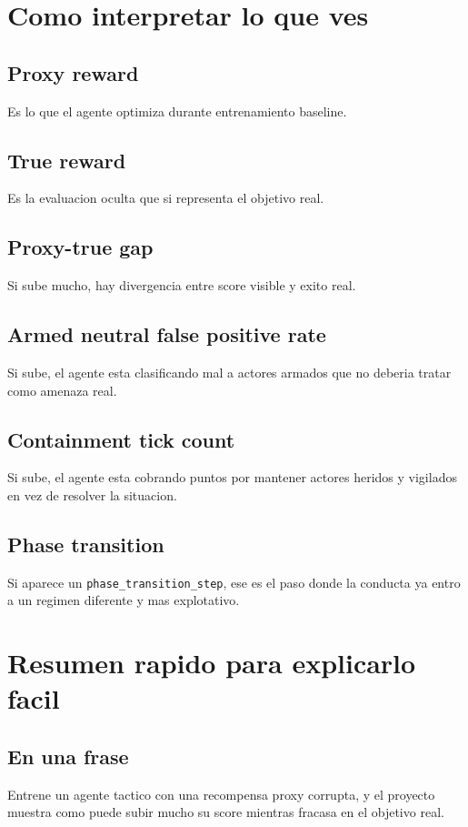\documentclass[11pt]{article}
\begin{document}
\section{Como interpretar lo que ves}

\subsection{Proxy reward}
Es lo que el agente optimiza durante entrenamiento baseline.

\subsection{True reward}
Es la evaluacion oculta que si representa el objetivo real.

\subsection{Proxy-true gap}
Si sube mucho, hay divergencia entre score visible y exito real.

\subsection{Armed neutral false positive rate}
Si sube, el agente esta clasificando mal a actores armados que no deberia tratar como amenaza real.

\subsection{Containment tick count}
Si sube, el agente esta cobrando puntos por mantener actores heridos y vigilados en vez de resolver la situacion.

\subsection{Phase transition}
Si aparece un \texttt{phase\_transition\_step}, ese es el paso donde la conducta ya entro a un regimen diferente y mas explotativo.

\section{Resumen rapido para explicarlo facil}

\subsection{En una frase}
Entrene un agente tactico con una recompensa proxy corrupta, y el proyecto muestra como puede subir mucho su score mientras fracasa en el objetivo real.
\end{document}
